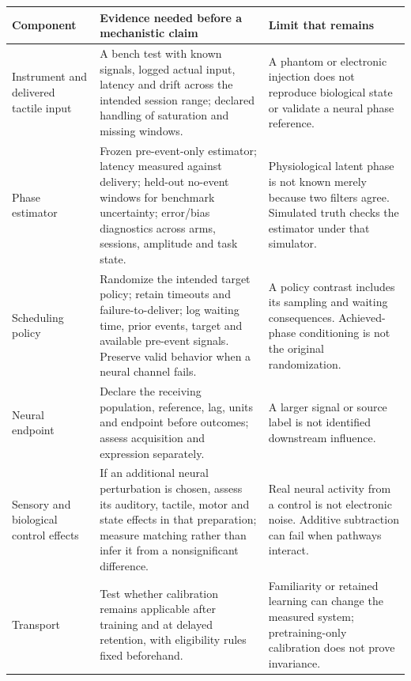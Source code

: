\documentclass[
  american,
  11pt,
  letterpaper,
]{article}
\newcounter{none} %
\begin{document}
{\def\LTcaptype{none} %
\begin{longtable}[]{@{}
  >{\raggedright\arraybackslash}p{}
  >{\raggedright\arraybackslash}p{}
  >{\raggedright\arraybackslash}p{}@{}}
\toprule\noalign{}
\begin{minipage}[b]{\linewidth}\raggedright
Component
\end{minipage} & \begin{minipage}[b]{\linewidth}\raggedright
Evidence needed before a mechanistic claim
\end{minipage} & \begin{minipage}[b]{\linewidth}\raggedright
Limit that remains
\end{minipage} \\
\midrule\noalign{}
\endhead
\bottomrule\noalign{}
\endlastfoot
Instrument and delivered tactile input & A bench test with known signals, logged actual input, latency and drift across the intended session range; declared handling of saturation and missing windows. & A phantom or electronic injection does not reproduce biological state or validate a neural phase reference. \\
Phase estimator & Frozen pre-event-only estimator; latency measured against delivery; held-out no-event windows for benchmark uncertainty; error/bias diagnostics across arms, sessions, amplitude and task state. & Physiological latent phase is not known merely because two filters agree. Simulated truth checks the estimator under that simulator. \\
Scheduling policy & Randomize the intended target policy; retain timeouts and failure-to-deliver; log waiting time, prior events, target and available pre-event signals. Preserve valid behavior when a neural channel fails. & A policy contrast includes its sampling and waiting consequences. Achieved-phase conditioning is not the original randomization. \\
Neural endpoint & Declare the receiving population, reference, lag, units and endpoint before outcomes; assess acquisition and expression separately. & A larger signal or source label is not identified downstream influence. \\
Sensory and biological control effects & If an additional neural perturbation is chosen, assess its auditory, tactile, motor and state effects in that preparation; measure matching rather than infer it from a nonsignificant difference. & Real neural activity from a control is not electronic noise. Additive subtraction can fail when pathways interact. \\
Transport & Test whether calibration remains applicable after training and at delayed retention, with eligibility rules fixed beforehand. & Familiarity or retained learning can change the measured system; pretraining-only calibration does not prove invariance. \\
\end{longtable}
}
\end{document}
